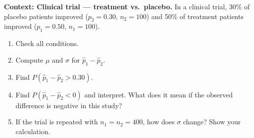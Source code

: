 \documentclass[10pt]{article}
\begin{document}
\vspace{0.12in}

\begin{tcolorbox}[colback=redbg, colframe=black!40, boxrule=0.6pt, arc=2mm,
    left=3mm, right=3mm, top=2mm, bottom=2mm, title=\textbf{Tier E --- Extension}]
\textbf{Context: Clinical trial --- treatment vs.\ placebo.}
In a clinical trial, 30\% of placebo patients improved ($p_2 = 0.30$, $n_2 = 100$)
and 50\% of treatment patients improved ($p_1 = 0.50$, $n_1 = 100$).

\begin{enumerate}
  \item Check all conditions.
  \item Compute $\mu$ and $\sigma$ for $\hat{p}_1 - \hat{p}_2$.
        \vspace{0.5in}
  \item Find $P(\hat{p}_1 - \hat{p}_2 > 0.30)$.
        \vspace{0.8in}
  \item Find $P(\hat{p}_1 - \hat{p}_2 < 0)$ and interpret. What does it mean if the
        observed difference is negative in this study?
        \vspace{0.9in}
  \item If the trial is repeated with $n_1 = n_2 = 400$, how does $\sigma$ change?
        Show your calculation.
        \vspace{0.7in}
\end{enumerate}
\end{tcolorbox}
\end{document}
